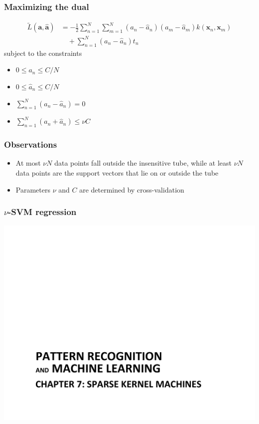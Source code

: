 \documentclass[t,14pt]{beamer}
\begin{document}
\begin{frame}
  \frametitle{Maximizing the dual}
  \vspace{-2em}
  \begin{align} 
    \widetilde{L}(\mathbf{a}, \widehat{\mathbf{a}}) &= 
        -\frac{\displaystyle 1}{\displaystyle 2}
        \sum\limits_{n=1}^N \sum\limits_{m=1}^N 
            (a_n - \widehat{a}_n)(a_m - \widehat{a}_m)
            k(\mathbf{x}_n,\mathbf{x}_m) \nonumber \\
            &\quad + \sum\limits_{n=1}^N(a_n - \widehat{a}_n)t_n
  \end{align}
  subject to the constraints
  \begin{multicols}{2}
  \begin{itemize}
    \item {$0 \leq a_n \leq C/N$}
    \item {$0 \leq \widehat{a}_n \leq C/N$}
    \item {$\sum\limits_{n=1}^N(a_n - \widehat{a}_n) = 0$} 
    \vfill
    \columnbreak
    \item {$\sum\limits_{n=1}^N(a_n + \widehat{a}_n) \leq \nu C$} 
  \end{itemize}
  \end{multicols}
\end{frame}

\begin{frame}
  \frametitle{Observations}
  \begin{itemize}
    \item{  
            At most $\nu N$ data points fall outside the insensitive tube, while 
            at least $\nu N$ data points are the support vectors that lie on or 
            outside the tube
         }
    \item {Parameters $\nu$ and $C$ are determined by cross-validation}
  \end{itemize}
\end{frame}

\begin{frame}
  \frametitle{$\nu$-SVM regression}
  \includegraphics[trim=2cm 0cm 0cm 5cm,clip,scale=0.5,page=10]{Chapter_7.pdf}
\end{frame}
\end{document}
